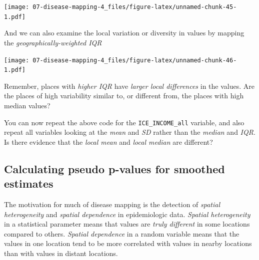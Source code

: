 \documentclass[
]{book}
\newenvironment{Shaded}{\begin{snugshade}}{\end{snugshade}}
\newcommand{\AttributeTok}[1]{\textcolor[rgb]{0.13,0.29,0.53}{#1}}
\newcommand{\CommentTok}[1]{\textcolor[rgb]{0.56,0.35,0.01}{\textit{#1}}}
\newcommand{\FunctionTok}[1]{\textcolor[rgb]{0.13,0.29,0.53}{\textbf{#1}}}
\newcommand{\NormalTok}[1]{#1}
\newcommand{\SpecialCharTok}[1]{\textcolor[rgb]{0.81,0.36,0.00}{\textbf{#1}}}
\newcommand{\StringTok}[1]{\textcolor[rgb]{0.31,0.60,0.02}{#1}}
\begin{document}
\texttt{[image: 07-disease-mapping-4\_files/figure-latex/unnamed-chunk-45-1.pdf]}

And we can also examine the local variation or diversity in values by mapping the \emph{geographically-weighted IQR}

\begin{Shaded}
\end{Shaded}

\texttt{[image: 07-disease-mapping-4\_files/figure-latex/unnamed-chunk-46-1.pdf]}

Remember, places with \emph{higher IQR} have \emph{larger local differences} in the values. Are the places of high variability similar to, or different from, the places with high median values?

You can now repeat the above code for the \texttt{ICE\_INCOME\_all} variable, and also repeat all variables looking at the \emph{mean} and \emph{SD} rather than the \emph{median} and \emph{IQR}. Is there evidence that the \emph{local mean} and \emph{local median} are different?

\hypertarget{calculating-pseudo-p-values-for-smoothed-estimates}{%
\subsection{Calculating pseudo p-values for smoothed estimates}\label{calculating-pseudo-p-values-for-smoothed-estimates}}

The motivation for much of disease mapping is the detection of \emph{spatial heterogeneity} and \emph{spatial dependence} in epidemiologic data. \emph{Spatial heterogeneity} in a statistical parameter means that values are \emph{truly different} in some locations compared to others. \emph{Spatial dependence} in a random variable means that the values in one location tend to be more correlated with values in nearby locations than with values in distant locations.
\end{document}
